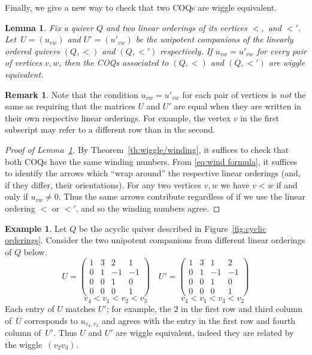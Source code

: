 \documentclass[11pt, letterpaper]{amsart}
\newtheorem{lemma}[theorem]{Lemma}
\theoremstyle{definition}
\newtheorem{remark}[theorem]{Remark}
\newtheorem{example}[theorem]{Example}
\numberwithin{equation}{section}
\begin{document}
Finally, we give a new way to check that two COQs are wiggle equivalent.

\begin{lemma}
\label{lem:wiggle equiv if both upper triangular}
Fix a quiver $Q$ and two linear orderings of its vertices $<,$ and $<'$.
Let~$U=(u_{vw})$ and $U'=(u'_{vw})$ be the unipotent companions of the linearly ordered quivers $(Q, <)$ and $(Q, <')$ respectively.
If $u_{vw} = u'_{vw}$ for every pair of vertices $v,w$, then the COQs associated to $(Q, <)$ and $(Q, <')$ are wiggle equivalent.
\end{lemma}

\begin{remark}
Note that the condition $u_{vw} = u'_{vw}$ for each pair of vertices is \emph{not} the same as requiring that the matrices $U$ and $U'$ are equal when they are written in their own respective linear orderings.
For example, the vertex $v$ in the first subscript may refer to a different row than in the second.
\end{remark}

\begin{proof}[Proof of Lemma~\ref{lem:wiggle equiv if both upper triangular}]
By Theorem~\ref{th:wiggle/winding}, it suffices to check that both COQs have the same winding numbers.
From \eqref{eq:wind formula}, it suffices to identify the arrows which ``wrap around'' the respective linear orderings (and, if they differ, their orientations).
For any two vertices $v,w$ we have $v < w$ if and only if $u_{vw} \neq 0$.
Thus the same arrows contribute regardless of if we use the linear ordering $<$ or $<'$, and so the winding numbers agree.
\end{proof}

\begin{example}
Let $Q$ be the acyclic quiver described in Figure~\ref{fig:cyclic orderings}.
Consider the two unipotent companions from different linear orderings of $Q$ below.
$$U= 
\begin{pmatrix} 1 & 3 &  2 & 1 \\ 0 & 1 & -1 & -1 \\ 0 & 0 & 1 & 0\\ 0 & 0 & 0 & 1 \end{pmatrix}
\quad 
U' = 
\begin{pmatrix} 1 & 3 &  1 & 2 \\ 0 & 1 & -1 & -1 \\ 0 & 0 & 1 & 0\\ 0 & 0 & 0 & 1 \end{pmatrix}$$
$$ \quad \quad v_4 < v_1 < v_2 < v_3  \quad \quad \quad \quad v_4 < v_1 < v_3 < v_2 $$
Each entry of $U$ matches $U'$; for example, the $2$ in the first row and third column of~$U$ corresponds to $u_{v_4, v_2}$ and agrees with the entry in the first row and fourth column of~$U'$. 
Thus $U$ and $U'$ are wiggle equivalent, indeed they are related by the wiggle~$(v_2 v_3)$.
\end{example}
\end{document}
